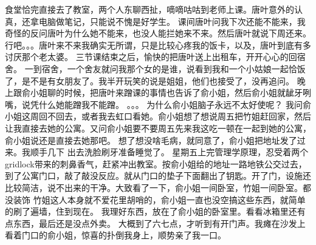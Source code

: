 食堂恰完直接去了教室，两个人东聊西扯，嘀嘀咕咕到老师上课。唐叶意外的认真，还拿电脑做笔记，只能说不愧是好学生。
课间唐叶问我下次还能不能来，我奇怪的反问唐叶为什么她不能来，也没人能拦她来不来。然后唐叶就说下周还来。
行吧。。。唐叶来不来我确实无所谓，只是比较心疼我的饭卡，以及，唐叶到底有多讨厌那个老太婆。
三节课结束之后，愉快的把唐叶送上出租车，开开心心的回宿舍。
一到宿舍，一个舍友就问我那个女的是谁，说看到我和一个小姑娘一起恰饭了，是不是有女朋友了。我半开玩笑的说是姐姐，他们也接受了，没再追问。
晚上跟俞小姐聊的时候，把唐叶来蹭课的事情也告诉了俞小姐，然后俞小姐就龇牙咧嘴，说凭什么她能蹭我不能蹭。
。。。
为什么俞小姐脑子永远不太好使呢？
我问俞小姐这周回不回去，或者我去虹口看她。俞小姐想了想说周五把竹姐赶回家，然后让我直接去她的公寓。又问俞小姐要不要周五先来我这吃一顿在一起到她的公寓，俞小姐说还是直接去她那吧。
想了想没啥毛病，就同意了，俞小姐把地址发了过来。我顺手几下 出去洗脸刷牙准备睡觉了。
星期五上完管理学原理，忍受着两个gridlock带来的刺鼻香气，赶紧冲出教室。按俞小姐给的地址一路地铁公交过去，到了公寓门口，敲了敲没反应。就从门口的垫子下面翻出了钥匙。开了门，设施还比较简洁，说不出来的干净。大致看了一下，俞小姐一间卧室，竹姐一间卧室。都没装饰 竹姐这人本身就不爱花里胡哨的，俞小姐一直也没空搞这些东西，就简单的刷了遍墙，住到现在。
我理好东西，放在了俞小姐的卧室里。看看冰箱里还有点东西，最后还是没点外卖。
大概到了六七点，才听到有开门声。我瘫在沙发上看着门口的俞小姐，惊喜的扑倒我身上，顺势亲了我一口。

